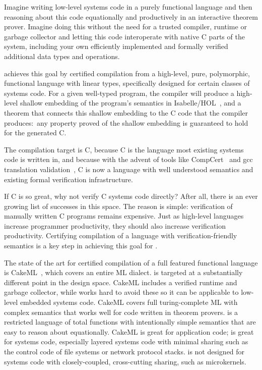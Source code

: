 \documentclass[9pt\ifFinal\else,preprint,nocopyrightspace\fi,\ifAlpha\else natbib,authoryear\fi]{sigplanconf}
\begin{document}
Imagine writing low-level systems code in a purely functional language and then
reasoning about this code equationally and productively in an interactive
theorem prover. Imagine doing this without the need for a trusted compiler,
runtime or
garbage collector and letting this code interoperate with native C parts of
the system, including your own efficiently implemented and formally verified
additional data types and operations.

\CDSL achieves this goal by certified compilation from a high-level, pure,
polymorphic, functional language with linear types, specifically designed for
certain classes of systems code. For a given well-typed \CDSL program, the
compiler will produce a high-level shallow embedding of the program's
semantics in Isabelle/HOL~\citep{Nipkow_Klein:Isabelle}, and a theorem that
connects this shallow embedding to the C code that the compiler produces:~any 
property proved of the shallow embedding is guaranteed
to hold for the generated C.

The compilation target is C, because C is the language most existing 
systems code is written in, and because with the advent of tools like
CompCert~\citep{Leroy_06,Leroy_09} and gcc translation
validation~\citep{Sewell_MK_13}, C is now a language with well understood
semantics and existing formal verification infrastructure.

If C is so great, why not verify C systems code directly? After all, there is
an ever growing list of successes
\citep{Klein_EHACDEEKNSTW_09,Klein_AEMSKH_14,Gu_KRSWWZG_15,Beringer_PYA_15}
in this space. The reason is simple: verification of manually written C
programs remains expensive. Just as high-level languages increase
programmer productivity, they should also increase verification productivity.
Certifying compilation of a language with verification-friendly semantics is
a key step in achieving this goal for \CDSL.

The state of the art for certified compilation of a full featured
functional language is
CakeML~\citep{Kumar_MNO_14}, which covers an entire ML dialect. \CDSL is
targeted at a substantially different point in the design space. CakeML includes a verified runtime and garbage collector,
while \CDSL
works hard to avoid these so it can be applicable to low-level embedded
systems code. CakeML covers full turing-complete ML with complex semantics
that works well for code written in theorem provers.
\CDSL is a restricted language of total functions with intentionally simple
semantics that are easy to reason about equationally.
CakeML is great for application code; \CDSL is great for systems code,
especially layered systems code with minimal sharing such as the control
code of file systems or network protocol stacks. \CDSL is not designed for
systems code with closely-coupled, cross-cutting sharing, such as
microkernels.
\end{document}
